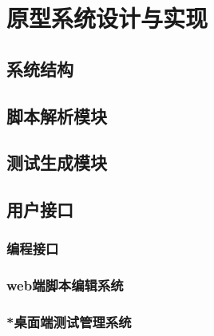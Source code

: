 \chapter{原型系统设计与实现}

	\section{系统结构}

	\section{脚本解析模块}

	\section{测试生成模块}

	\section{用户接口}
		\subsection{编程接口}

		\subsection{web端脚本编辑系统}

		\subsection{*桌面端测试管理系统}


